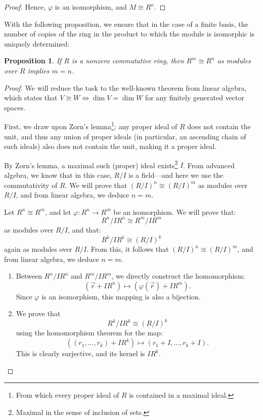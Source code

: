 \documentclass{article}
\newif\ifusemulticols
\theoremstyle{definition}
\theoremstyle{remark}
\theoremstyle{plain}
\theoremstyle{plain}
\newtheorem{prop}[theorem]{Proposition}
\newenvironment{mymulticols}
    { \ifusemulticols \begin{multicols}{2} \fi }
    { \ifusemulticols \end{multicols} \fi }
\begin{document}
\begin{mymulticols}
\begin{proof}
    Hence, $\varphi$ is an isomorphism, and $M \cong R^n$.
\end{proof}

With the following proposition, we ensure that in the case of a finite basis, the number of copies of the ring in the product to which the module is isomorphic is uniquely determined:

\begin{prop}
    \label{prop:commut_rank}
    If $R$ is a nonzero commutative ring, then $R^m \cong R^n$ as modules over $R$ implies $m = n$.
\end{prop}
\begin{proof}
    We will reduce the task to the well-known theorem from linear algebra, which states that $V
    \cong W \Leftrightarrow \dim V = \dim W$ for any finitely generated vector spaces.

    First, we draw upon Zorn's lemma\footnote{From which every proper ideal of $R$ is contained in a
    maximal ideal.}: any proper ideal of $R$ does not contain the unit, and thus any union of proper
    ideals (in particular, an ascending chain of such ideals) also does not contain the unit, making
    it a proper ideal.

    By Zorn's lemma, a maximal such (proper) ideal exists\footnote{Maximal in the sense of inclusion
    of sets.} $I$.
    From advanced algebra, we know that in this case, $R / I$ is a field—and here we use the
    commutativity of $R$.
    We will prove that $(R / I)^n \cong (R / I)^m$ as modules over $R / I$, and from linear algebra, we deduce $n = m$.

    Let $R^n \cong R^m$, and let $\varphi : R^n \to R^m$ 
    be an isomorphism. We will prove that: $${R^n}/{IR^n} \cong {R^m}/{IR^m}$$
    as modules over $R / I$, and that: $${R^k}/{IR^k} \cong \left(R / I\right)^k$$
    again as modules over $R / I$. From this, it follows that $\left(R / I\right)^n \cong \left(R / I\right)^m$, and from linear algebra, we deduce $n = m$.
    \begin{enumerate}
        \item Between ${R^n}/{IR^n}$ and ${R^m}/{IR^m}$, we directly construct the homomorphism:
            $$(\vec{r} + IR^n) \mapsto (\varphi(\vec{r}) + IR^m).$$
            Since $\varphi$ is an isomorphism, this mapping is also a bijection.
        \item We prove that $${R^k}/{IR^k} \cong \left(R / I\right)^k$$ using the homomorphism
            theorem for the map: $$\left(\left(r_1, \ldots, r_k\right) + IR^k\right) \mapsto \left(r_1 + I, \ldots, r_k + I\right).$$
            This is clearly surjective, and its kernel is $IR^k$.
    \end{enumerate}
\end{proof}


\end{mymulticols}
\end{document}
